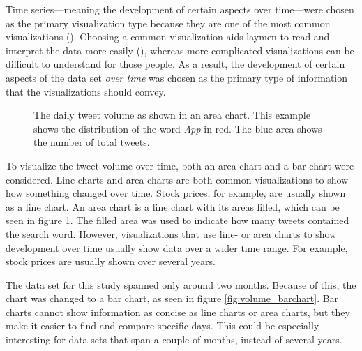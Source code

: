 Time series---meaning the development of certain aspects over time---were chosen as the primary visualization type because they are one of the most common visualizations (\cite{heerTourVisualizationZoo2010}). Choosing a common visualization aids laymen to read and interpret the data more easily (\cite{bornerInvestigatingAspectsData2016}), whereas more complicated visualizations can be difficult to understand for those people. As a result, the development of certain aspects of the data set \emph{over time} was chosen as the primary type of information that the visualizations should convey.

\begin{figure}[h!tb]
    \caption{The daily tweet volume as shown in an area chart. This example shows the distribution of the word \emph{App} in red. The blue area shows the number of total tweets.}
    \label{fig:volume_areachart}
\end{figure}

To visualize the tweet volume over time, both an area chart and a bar chart were considered. Line charts and area charts are both common visualizations to show how something changed over time. Stock prices, for example, are usually shown as a line chart. An area chart is a line chart with its areas filled, which can be seen in figure \ref{fig:volume_areachart}. The filled area was used to indicate how many tweets contained the search word. However, visualizations that use line- or area charts to show development over time usually show data over a wider time range. For example, stock prices are usually shown over several years. 

The data set for this study spanned only around two months. Because of this, the chart was changed to a bar chart, as seen in figure \ref{fig:volume_barchart}. Bar charts cannot show information as concise as line charts or area charts, but they make it easier to find and compare specific days. This could be especially interesting for data sets that span a couple of months, instead of several years.

